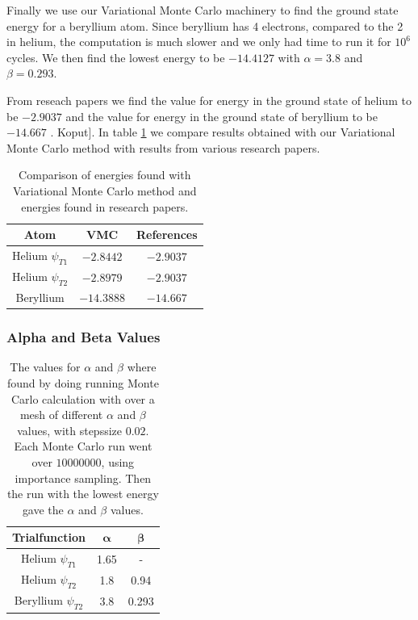 \documentclass[11pt]{article}
\begin{document}
		Finally we use our Variational Monte Carlo machinery to find the ground
		state energy for a beryllium atom. Since beryllium has 4 electrons,
		compared to the 2 in helium, the computation is much slower and we
		only had time to run it for $10^{6}$ cycles. We then find the lowest
		energy to be $-14.4127$ with $\alpha=3.8$ and $\beta=0.293$.

		From reseach papers we find the value for energy in the ground state
		of helium to be $-2.9037$ \cite{Kinoshita:1957:PR} and the value
		for energy in the ground state of beryllium to be $-14.667$ \cite{Koput:2011:PCCP}.
		Koput{]}. In table \ref{tab:energyReference} we compare results
		obtained with our Variational Monte Carlo method with results from
		various research papers.

		\begin{table}
			\centering
			\begin{tabular}{|c|c|c|}
				\hline
				Atom & VMC & References\tabularnewline
				\hline
				\hline
				Helium $\psi_{T1}$ & $-2.8442$ & $-2.9037$ \tabularnewline
				\hline
				Helium $\psi_{T2}$ & $-2.8979$ & $-2.9037$ \tabularnewline
				\hline
				Beryllium & $-14.3888$ & $-14.667$\tabularnewline
				\hline
			\end{tabular}

			\protect
			\caption{Comparison of energies found with Variational Monte Carlo method and
			energies found in research papers.}
			\label{tab:energyReference}
		\end{table}

		\subsubsection{Alpha and Beta Values}

			\begin{table}
				\center
				\begin{tabular}{| c | c| c |}
				    \hline
				   	\textbf{Trialfunction} & \(\mathbf{\alpha}\) & \(\mathbf{\beta}\)
				    \\ \hline
				    Helium $\psi_{T1}$ & 1.65 & -
				    \\ \hline
				    Helium $\psi_{T2}$ & 1.8 & 0.94
				    \\	\hline
				    Beryllium $\psi_{T2}$	& 3.8	&	 0.293
				    \\ \hline
		  		\end{tabular}
		  		\caption{The values for \(\alpha\) and \( \beta \) where found by doing running Monte Carlo calculation with over a mesh of different \(\alpha\) and \( \beta \) values, with stepssize \(0.02\). Each Monte Carlo run went over \(10 000 	000\), using importance sampling. Then the run with the lowest energy gave the \(\alpha\) and \(\beta\) values.}
			  	\label{tab:alpha_beta}
			\end{table}
\end{document}
